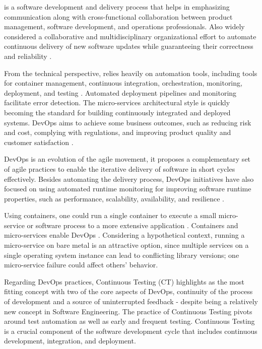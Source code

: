 \devops is a software development and delivery process that helps in emphasizing
communication along with cross-functional collaboration between product
management, software development, and operations professionals. Also widely
considered a collaborative and multidisciplinary organizational effort to
automate continuous delivery of new software updates while guaranteeing their
correctness and reliability \cite{rocha2019}.

From the technical perspective, \devops relies heavily on automation tools,
including tools for container management, continuous integration, orchestration,
monitoring, deployment, and testing \cite{zhu2016}. Automated deployment
pipelines and monitoring facilitate error detection. The micro-services
architectural style is quickly becoming the standard for building continuously
integrated and deployed systems. DevOps aims to achieve some business outcomes,
such as reducing risk and cost, complying with regulations, and improving
product quality and customer satisfaction \cite{rocha2019}.

DevOps is an evolution of the agile movement, it proposes a complementary set of
agile practices to enable the iterative delivery of software in short cycles
effectively. Besides automating the delivery process, DevOps initiatives have
also focused on using automated runtime monitoring for improving software
runtime properties, such as performance, scalability, availability, and
resilience \cite{rocha2019}.

Using containers, one could run a single container to execute a small
micro-service or software process to a more extensive application
\cite{golden2019}. Containers and micro-services enable DevOps \cite{rocha2019}.
Considering a hypothetical context, running a micro-service on bare metal is an
attractive option, since multiple services on a single operating system instance
can lead to conflicting library versions; one micro-service failure could affect
others' behavior.

Regarding DevOps practices, Continuous Testing (CT) highlights as the most
fitting concept with two of the core aspects of DevOps, continuity of the
process of development and a source of uninterrupted feedback - despite being a
relatively new concept in Software Engineering. The practice of Continuous
Testing pivots around test automation as well as early and frequent testing.
Continuous Testing is a crucial component of the software development cycle that
includes continuous development, integration, and deployment. 

